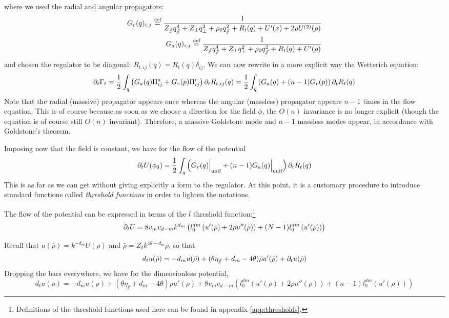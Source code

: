 where we used the radial and angular propagators:
\begin{align}
G_r(q)_{i,j}  \overset{\text{def}}{=}  \frac{1}{Z_\sslash q_\sslash^4 + Z_\perp q_\perp^2 + \rho_0 q_\sslash^2 + R_t(q)  + U'(x) + 2 \rho U^{(2)}(\rho)} \\
G_a(q)_{i,j}  \overset{\text{def}}{=}  \frac{1}{Z_\sslash q_\sslash^4 + Z_\perp q_\perp^2 + \rho_0 q_\sslash^2 + R_t(q) + U'(\rho)}
\end{align}
and chosen the regulator to be diagonal:  $R_{t,ij}(q) = R_t(q) \delta_{ij}$.
We can now rewrite in a more explicit way the Wetterich equation:
\begin{equation}
\partial_{t} \Gamma_t = \frac{1}{2} \int_q \left(  G_a(q) \Pi^a_{ij} + G_r(p) \Pi^r_{ij} \right) \partial_{t} R_{t,ij}(q)  = \frac{1}{2} \int_q \left(  G_a(q) + (n-1)G_r(p) \right) \partial_{t} R_{t}(q) 
\end{equation}
Note that the radial (massive) propagator appears once whereas the angular (massless) propagator appears $n-1$ times in the flow equation. This is of course because as soon as we choose a direction for the field $\phi$, the  $O(n)$ invariance is no longer explicit (though the equation is of course still $O(n)$ invariant). Therefore, a massive Goldstone mode and $n-1$ massless modes appear, in accordance with Goldstone's theorem.

Imposing now that the field is constant, we have for the flow of the potential
\begin{equation}
\partial_{t} U(\phi_0) = \frac{1}{2} \int_q \left( G_r(q) \Big|_{\text{unif}}  + (n-1)G_a(q) \Big|_{\text{unif}}  \right) \partial_{t} R_t(q)
\end{equation}
This is as far as we can get without giving explicitly a form to the regulator. 
At this point, it is a customary procedure to introduce standard functions called \textit{threshold functions} in order to lighten the notations.

The flow of the potential can be expressed in terms of the $l$ threshold function:\footnote{Definitions of the threshold functions used here can be found in appendix \ref{app:thresholds}.}
\begin{equation}
\partial_{t}U = 8 v_m v_{d-m} k^{d_m} \left( l_0^{dm}\left(u'(\bar{\rho}) + 2 \bar{\rho} u''(\bar{\rho}) \right) + (N-1)l_0^{dm}\left(u'(\bar{\rho})\right) \right)
\end{equation}

Recall that $u(\bar{\rho}) = k^{-d_m} U(\rho)$ and $\bar{\rho} = Z_\sslash k^{4\theta - d_m} \rho$, so that
\begin{equation}
d_t u(\bar{\rho}) = -d_m u(\bar{\rho}) +(\theta \eta_\sslash + d_m - 4 \theta) \bar{\rho} u'(\bar{\rho}) + \partial_{t} u(\bar{\rho})
\end{equation}
Dropping the bars everywhere, we have for the dimensionless potential,
\begin{equation}
d_t u(\rho) = -d_m u(\rho) +(\theta \eta_\sslash + d_m - 4 \theta) \rho u'(\rho) + 8 v_m v_{d-m} \left( l_0^{dm}\left(u'(\rho) + 2 \rho u''(\rho) \right) + (n-1)l_0^{dm}\left(u'(\rho)\right) \right)
\end{equation}


